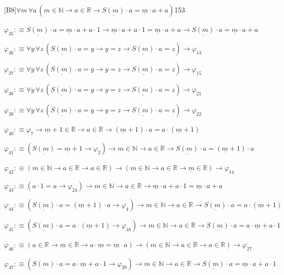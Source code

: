 \begin{fullproof}{[B8]}{$\forall m\,\forall a\,(m \in \mathbb{N} \to a \in \mathbb{R} \to \underline{S(m)} \cdot a = \underline{m} \cdot a + a)$}{153}
\begin{abbrevlist}
\item $\varphi_{35} :\equiv \underline{S(m)} \cdot a = \underline{m} \cdot a + a \cdot 1 \to \underline{m} \cdot a + a \cdot 1 = \underline{m} \cdot a + a \to \underline{S(m)} \cdot a = \underline{m} \cdot a + a$
\item $\varphi_{36} :\equiv \forall y\,\forall z\,(\underline{S(m)} \cdot a = y \to y = z \to \underline{S(m)} \cdot a = z) \to \varphi_{13}$
\item $\varphi_{37} :\equiv \forall y\,\forall z\,(\underline{S(m)} \cdot a = y \to y = z \to \underline{S(m)} \cdot a = z) \to \varphi_{15}$
\item $\varphi_{38} :\equiv \forall y\,\forall z\,(\underline{S(m)} \cdot a = y \to y = z \to \underline{S(m)} \cdot a = z) \to \varphi_{21}$
\item $\varphi_{39} :\equiv \forall y\,\forall z\,(\underline{S(m)} \cdot a = y \to y = z \to \underline{S(m)} \cdot a = z) \to \varphi_{22}$
\item $\varphi_{40} :\equiv \varphi_{7} \to \underline{m} + 1 \in \mathbb{R} \to a \in \mathbb{R} \to (\underline{m} + 1) \cdot a = a \cdot (\underline{m} + 1)$
\item $\varphi_{41} :\equiv (\underline{S(m)} = \underline{m} + 1 \to \varphi_{2}) \to m \in \mathbb{N} \to a \in \mathbb{R} \to \underline{S(m)} \cdot a = (\underline{m} + 1) \cdot a$
\item $\varphi_{42} :\equiv (m \in \mathbb{N} \to a \in \mathbb{R} \to a \in \mathbb{R}) \to (m \in \mathbb{N} \to a \in \mathbb{R} \to \underline{m} \in \mathbb{R}) \to \varphi_{14}$
\item $\varphi_{43} :\equiv (a \cdot 1 = a \to \varphi_{24}) \to m \in \mathbb{N} \to a \in \mathbb{R} \to \underline{m} \cdot a + a \cdot 1 = \underline{m} \cdot a + a$
\item $\varphi_{44} :\equiv (\underline{S(m)} \cdot a = (\underline{m} + 1) \cdot a \to \varphi_{4}) \to m \in \mathbb{N} \to a \in \mathbb{R} \to \underline{S(m)} \cdot a = a \cdot (\underline{m} + 1)$
\item $\varphi_{45} :\equiv (\underline{S(m)} \cdot a = a \cdot (\underline{m} + 1) \to \varphi_{16}) \to m \in \mathbb{N} \to a \in \mathbb{R} \to \underline{S(m)} \cdot a = a \cdot \underline{m} + a \cdot 1$
\item $\varphi_{46} :\equiv (a \in \mathbb{R} \to \underline{m} \in \mathbb{R} \to a \cdot \underline{m} = \underline{m} \cdot a) \to (m \in \mathbb{N} \to a \in \mathbb{R} \to a \in \mathbb{R}) \to \varphi_{27}$
\item $\varphi_{47} :\equiv (\underline{S(m)} \cdot a = a \cdot \underline{m} + a \cdot 1 \to \varphi_{20}) \to m \in \mathbb{N} \to a \in \mathbb{R} \to \underline{S(m)} \cdot a = \underline{m} \cdot a + a \cdot 1$

\end{abbrevlist}
\end{fullproof}
